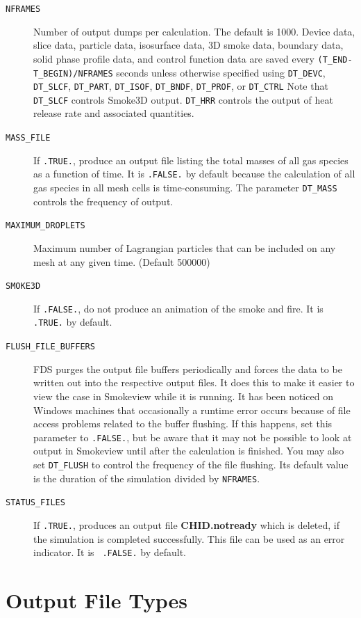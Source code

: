 \documentclass[11pt]{book}
\newcommand{\ct}{\tt\small}
\begin{document}
\begin{description}
\item[{\ct NFRAMES}] Number of output dumps per calculation. The default is 1000.
Device data, slice data, particle data, isosurface data, 3D smoke data, boundary data, solid phase profile data, and
control function data are saved every {\ct (T\_END-T\_BEGIN)/NFRAMES} seconds unless otherwise specified
using {\ct DT\_DEVC}, {\ct DT\_SLCF}, {\ct DT\_PART}, {\ct DT\_ISOF}, {\ct DT\_BNDF}, {\ct DT\_PROF},
or {\ct DT\_CTRL} Note that {\ct DT\_SLCF} controls Smoke3D output. {\ct DT\_HRR} controls the
output of heat release rate and associated quantities.
\item[{\ct MASS\_FILE}] If {\ct .TRUE.}, produce an output file listing the total masses of all gas species as a function of time.
It is {\ct .FALSE.} by default because the calculation
of all gas species in all mesh cells is time-consuming. The parameter {\ct DT\_MASS} controls the frequency of output.
\item[{\ct MAXIMUM\_DROPLETS}] Maximum number of Lagrangian particles that can be included on any
mesh at any given time. (Default 500000)
\item[{\ct SMOKE3D}] If {\ct .FALSE.}, do not produce an animation of the smoke and fire. It is {\ct .TRUE.} by default.
\item[{\ct FLUSH\_FILE\_BUFFERS}] FDS
purges the output file buffers periodically and forces the data to be written out
into the respective output files. It does this to make it easier to view the case in Smokeview while it is running.
It has been noticed on Windows
machines that occasionally a runtime error occurs because of file
access problems related to the buffer flushing. If this happens, set
this parameter to {\ct .FALSE.}, but be aware that it may not be
possible to look at output in Smokeview until after the calculation is
finished. You may also set {\ct DT\_FLUSH} to control the frequency of the file flushing. Its default value is the duration of
the simulation divided by {\ct NFRAMES}.
\item[{\ct STATUS\_FILES}] If {\ct .TRUE.}, produces an output file
{\bf CHID.notready} which is deleted, if the simulation is completed
successfully. This file can be used as an error indicator. It is {\ct
.FALSE.} by default.
\end{description}


\clearpage

\section{Output File Types}
\end{document}
